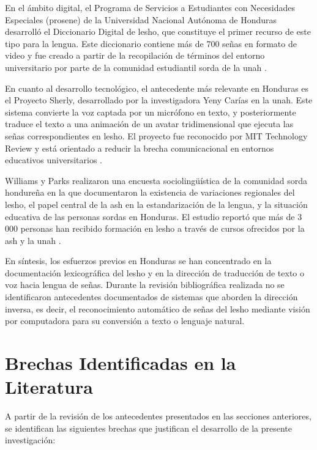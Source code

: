 En el ámbito digital, el Programa de Servicios a Estudiantes con Necesidades Especiales
(\acrshort{prosene}) de la Universidad Nacional Autónoma de Honduras desarrolló el Diccionario
Digital de \acrshort{lesho}, que constituye el primer recurso de este tipo para la lengua. Este
diccionario contiene más de 700 señas en formato de video y fue creado a partir de la
recopilación de términos del entorno universitario por parte de la comunidad estudiantil
sorda de la \acrshort{unah} \cite{unah_diccionario_2024}.

En cuanto al desarrollo tecnológico, el antecedente más relevante en Honduras es el
Proyecto Sherly, desarrollado por la investigadora Yeny Carías en la \acrshort{unah}. Este sistema
convierte la voz captada por un micrófono en texto, y posteriormente traduce el texto a
una animación de un avatar tridimensional que ejecuta las señas correspondientes en
\acrshort{lesho}. El proyecto fue reconocido por MIT Technology Review y está orientado a reducir
la brecha comunicacional en entornos educativos universitarios \cite{proceso_sherly_2014}.

Williams y Parks realizaron una encuesta sociolingüística de la comunidad sorda hondureña
en la que documentaron la existencia de variaciones regionales del \acrshort{lesho}, el papel central
de la \acrshort{ash} en la estandarización de la lengua, y la situación educativa de las personas sordas
en Honduras. El estudio reportó que más de 3\,000 personas han recibido formación en
\acrshort{lesho} a través de cursos ofrecidos por la \acrshort{ash} y la \acrshort{unah} \cite{williams_encuesta_2015}.

En síntesis, los esfuerzos previos en Honduras se han concentrado en la documentación
lexicográfica del \acrshort{lesho} y en la dirección de traducción de texto o voz hacia lengua de
señas. Durante la revisión bibliográfica realizada no se identificaron antecedentes
documentados de sistemas que aborden la dirección inversa, es decir, el reconocimiento
automático de señas del \acrshort{lesho} mediante visión por computadora para su conversión a
texto o lenguaje natural.

\section{Brechas Identificadas en la Literatura}

A partir de la revisión de los antecedentes presentados en las secciones anteriores, se
identifican las siguientes brechas que justifican el desarrollo de la presente investigación:

